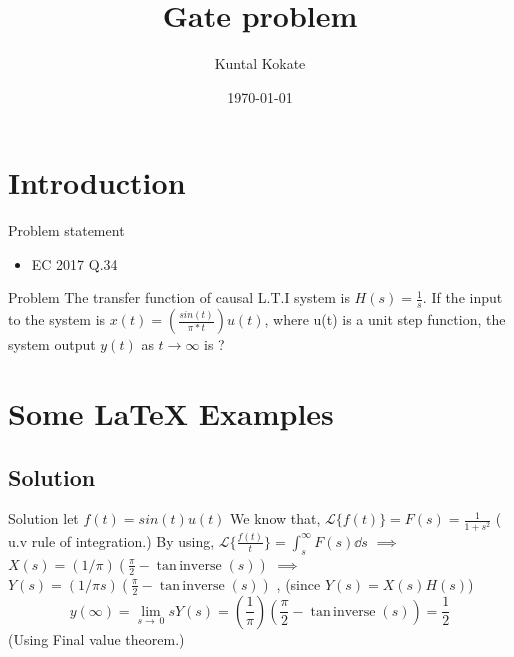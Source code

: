 \documentclass{beamer}
\title[Your Short Title]{Gate problem}
\author{Kuntal Kokate}
\institute{EE18BTECH11028}
\date{\today}
\DeclareMathOperator{\taninv}{tan\,inverse}
\begin{document}
\begin{frame}
  \titlepage
\end{frame}


\section{Introduction}

\begin{frame}{Problem statement}

\begin{itemize}
  \item EC 2017 Q.34
  
\end{itemize}

\vskip 1cm

\begin{block}{Problem}
The transfer function of causal L.T.I system is $ H(s) = \frac{1}{s}$. If the input to the system is 
$x(t) = (\frac{sin(t)}{\pi*t})u(t)$, where u(t) is a unit step function, the system output 
$y(t)$ as $t \to \infty$  is ?
\end{block}

\end{frame}

\section{Some \LaTeX{} Examples}

\subsection{Solution}
\begin{frame}{Solution}
let $f(t) = sin(t)u(t)$
\newline
We know that, $\mathcal{L}\{f(t)\} = F(s) = \frac{1}{1 + s^2} $
    ( u.v rule of integration.)
\newline
By using,  $\mathcal{L}\{\frac{f(t)}{t}\} = \int_{s}^{\infty}F(s) \dd{s} $
\newline
\newline
$\implies$ $X(s) = (1/ \pi)( \frac{\pi}{2} - \taninv(s))$
\newline
\newline
$\implies$ $Y(s) = (1/ \pi s) ( \frac{\pi}{2} - \taninv(s))$ , (since $Y(s) = X(s)H(s)$)
\newline
\newline
\[y(\infty) = \lim_{s\to\ 0} sY(s) =(\frac{1}{\pi}) ( \frac{\pi}{2} - \taninv(s)) = \frac{1}{2}\]
\hspace{1cm} (Using Final value theorem.)

\end{frame}
\end{document}
